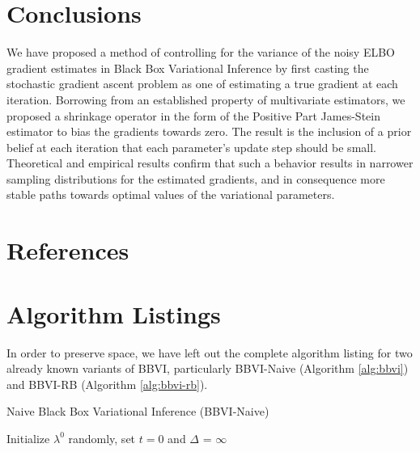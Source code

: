\documentclass{article}
\begin{document}
\section{Conclusions}

We have proposed a method of controlling for the variance of the noisy ELBO gradient estimates in Black Box Variational Inference by first casting the stochastic gradient ascent problem as one of estimating a true gradient at each iteration. Borrowing from an established property of multivariate estimators, we proposed a shrinkage operator in the form of the Positive Part James-Stein estimator to bias the gradients towards zero. The result is the inclusion of a prior belief at each iteration that each parameter's update step should be small. Theoretical and empirical results confirm that such a behavior results in narrower sampling distributions for the estimated gradients, and in consequence more stable paths towards optimal values of the variational parameters.

\section*{References}


{
    \small
    
}

\clearpage
\appendix

\section{Algorithm Listings}
\label{sec:algorithms}

In order to preserve space, we have left out the complete algorithm listing for two already known variants of BBVI, particularly BBVI-Naive (Algorithm \ref{alg:bbvi}) and BBVI-RB (Algorithm \ref{alg:bbvi-rb}).

\begin{algorithm}[ht]
    \label{alg:bbvi}
    \caption{Naive Black Box Variational Inference (BBVI-Naive) \cite{Ranganath-2014}}

    \DontPrintSemicolon
    \SetAlgoLined
    Initialize $\lambda^0$ randomly, set $t=0$ and $\Delta$ = $\infty$ \;
    \BlankLine
\end{algorithm}
\end{document}
